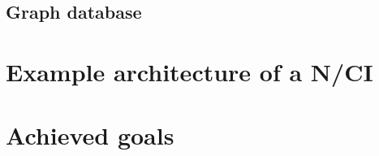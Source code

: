 \subsection{Graph database}
\label{chapter5-graph-database}


\section{Example architecture of a N/CI}
\label{chapter5-example-architecture-of-a-nci}





\section{Achieved goals}
\label{chapter5-achieved-goals}


